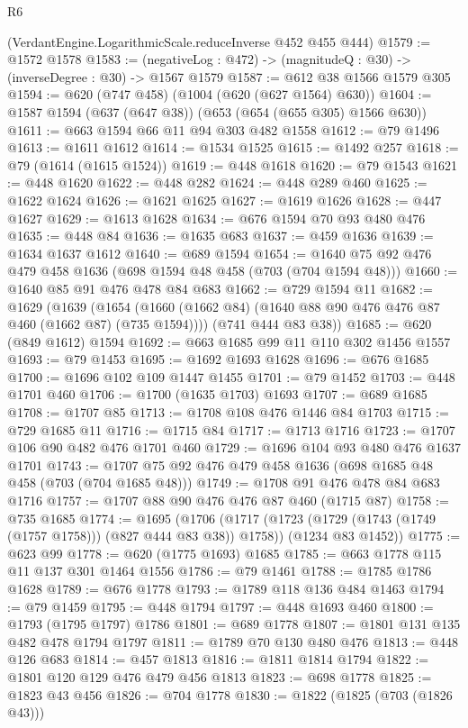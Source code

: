 \begin{lexlean}{R6}
\begin{coremodule}
    (VerdantEngine.LogarithmicScale.reduceInverse @452 @455 @444)
@1579 := @1572 @1578
@1583 := (negativeLog : @472) -> (magnitudeQ : @30) -> (inverseDegree : @30) -> @1567 @1579
@1587 := @612 @38 @1566 @1579 @305
@1594 := @620 (@747 @458) (@1004 (@620 (@627 @1564) @630))
@1604 := @1587 @1594 (@637 (@647 @38)) (@653 (@654 (@655 @305) @1566 @630))
@1611 := @663 @1594 @66 @11 @94 @303 @482 @1558
@1612 := @79 @1496
@1613 := @1611 @1612
@1614 := @1534 @1525
@1615 := @1492 @257
@1618 := @79 (@1614 (@1615 @1524))
@1619 := @448 @1618
@1620 := @79 @1543
@1621 := @448 @1620
@1622 := @448 @282
@1624 := @448 @289 @460
@1625 := @1622 @1624
@1626 := @1621 @1625
@1627 := @1619 @1626
@1628 := @447 @1627
@1629 := @1613 @1628
@1634 := @676 @1594 @70 @93 @480 @476
@1635 := @448 @84
@1636 := @1635 @683
@1637 := @459 @1636
@1639 := @1634 @1637 @1612
@1640 := @689 @1594
@1654 := @1640 @75 @92 @476 @479 @458 @1636 (@698 @1594 @48 @458 (@703 (@704 @1594 @48)))
@1660 := @1640 @85 @91 @476 @478 @84 @683
@1662 := @729 @1594 @11
@1682 := @1629
    (@1639
      (@1654 (@1660 (@1662 @84) (@1640 @88 @90 @476 @476 @87 @460 (@1662 @87) (@735 @1594))))
      (@741 @444 @83 @38))
@1685 := @620 (@849 @1612) @1594
@1692 := @663 @1685 @99 @11 @110 @302 @1456 @1557
@1693 := @79 @1453
@1695 := @1692 @1693 @1628
@1696 := @676 @1685
@1700 := @1696 @102 @109 @1447 @1455
@1701 := @79 @1452
@1703 := @448 @1701 @460
@1706 := @1700 (@1635 @1703) @1693
@1707 := @689 @1685
@1708 := @1707 @85
@1713 := @1708 @108 @476 @1446 @84 @1703
@1715 := @729 @1685 @11
@1716 := @1715 @84
@1717 := @1713 @1716
@1723 := @1707 @106 @90 @482 @476 @1701 @460
@1729 := @1696 @104 @93 @480 @476 @1637 @1701
@1743 := @1707 @75 @92 @476 @479 @458 @1636 (@698 @1685 @48 @458 (@703 (@704 @1685 @48)))
@1749 := @1708 @91 @476 @478 @84 @683 @1716
@1757 := @1707 @88 @90 @476 @476 @87 @460 (@1715 @87)
@1758 := @735 @1685
@1774 := @1695
    (@1706
      (@1717 (@1723 (@1729 (@1743 (@1749 (@1757 @1758))) (@827 @444 @83 @38)) @1758))
      (@1234 @83 @1452))
@1775 := @623 @99
@1778 := @620 (@1775 @1693) @1685
@1785 := @663 @1778 @115 @11 @137 @301 @1464 @1556
@1786 := @79 @1461
@1788 := @1785 @1786 @1628
@1789 := @676 @1778
@1793 := @1789 @118 @136 @484 @1463
@1794 := @79 @1459
@1795 := @448 @1794
@1797 := @448 @1693 @460
@1800 := @1793 (@1795 @1797) @1786
@1801 := @689 @1778
@1807 := @1801 @131 @135 @482 @478 @1794 @1797
@1811 := @1789 @70 @130 @480 @476
@1813 := @448 @126 @683
@1814 := @457 @1813
@1816 := @1811 @1814 @1794
@1822 := @1801 @120 @129 @476 @479 @456 @1813
@1823 := @698 @1778
@1825 := @1823 @43 @456
@1826 := @704 @1778
@1830 := @1822 (@1825 (@703 (@1826 @43)))

\end{coremodule}
\end{lexlean}
